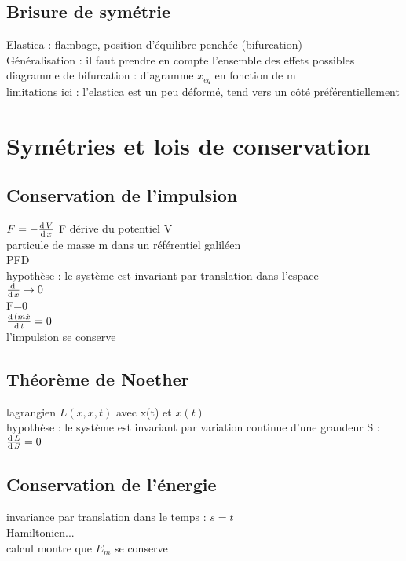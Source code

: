\subsection{Brisure de symétrie}
Elastica : flambage, position d'équilibre penchée (bifurcation) \\
Généralisation : il faut prendre en compte l'ensemble des effets possibles \\
diagramme de bifurcation : diagramme $x_{eq}$ en fonction de m \\ 
limitations ici : l'elastica est un peu déformé, tend vers un côté préférentiellement \\

\section{Symétries et lois de conservation}


\subsection{Conservation de l'impulsion}
$F=-\frac{\mathrm{d}\, V}{\mathrm{d}\, x}$ F dérive du potentiel V \\
particule de masse m dans un référentiel galiléen \\
PFD \\
hypothèse : le système est invariant par translation dans l'espace  \\
$\frac{\mathrm{d}\,}{\mathrm{d}\, x} \rightarrow 0$ \\
F=0 \\
$\frac{\mathrm{d}\,(m\dot{x}}{\mathrm{d}\, t} =0$ \\
l'impulsion se conserve \\

\subsection{Théorème de Noether}
lagrangien $L(x,\dot{x},t)$ avec x(t) et $\dot{x} (t)$ \\
hypothèse : le système est invariant par variation continue d'une grandeur S : $\frac{\mathrm{d}\, L}{\mathrm{d}\, S}=0$ \\

\subsection{Conservation de l'énergie}
invariance par translation dans le temps : $s=t$ \\
Hamiltonien...\\
calcul montre que $E_m$ se conserve \\



